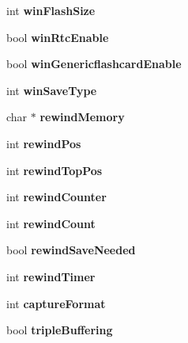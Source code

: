 \begin{DoxyCompactItemize}
\mbox{\label{class_v_b_a_a5c99844bc4d1e5556434afaa75ae91e5}} 
int {\bfseries win\+Flash\+Size}
\item 
\mbox{\label{class_v_b_a_ae289fc4c9e951e0844900c522c151170}} 
bool {\bfseries win\+Rtc\+Enable}
\item 
\mbox{\label{class_v_b_a_ac51ec97cd7b489be24edc77f346e5de7}} 
bool {\bfseries win\+Genericflashcard\+Enable}
\item 
\mbox{\label{class_v_b_a_a70060f88010280739406c87ef66d036a}} 
int {\bfseries win\+Save\+Type}
\item 
\mbox{\label{class_v_b_a_ad2f4e21586cc185a1e6525080532471a}} 
char $\ast$ {\bfseries rewind\+Memory}
\item 
\mbox{\label{class_v_b_a_a5d8ea18c98b5188813210a84819da5e8}} 
int {\bfseries rewind\+Pos}
\item 
\mbox{\label{class_v_b_a_aa83e33c3d4bb203a5d223a0906a977d8}} 
int {\bfseries rewind\+Top\+Pos}
\item 
\mbox{\label{class_v_b_a_a63a3cf03d4213b2596b59226134b0d5b}} 
int {\bfseries rewind\+Counter}
\item 
\mbox{\label{class_v_b_a_a39430ba84d3e7205846e24f0484d7880}} 
int {\bfseries rewind\+Count}
\item 
\mbox{\label{class_v_b_a_a3f8cd6f6705f0306f57818e885a50aa3}} 
bool {\bfseries rewind\+Save\+Needed}
\item 
\mbox{\label{class_v_b_a_a682a6a9633f41038b23a2bdcdbde844e}} 
int {\bfseries rewind\+Timer}
\item 
\mbox{\label{class_v_b_a_a103f0b25433c57c4458a208a06799cf8}} 
int {\bfseries capture\+Format}
\item 
\mbox{\label{class_v_b_a_af597e2c2466efdc6365a5d725651b855}} 
bool {\bfseries triple\+Buffering}
\item 

\end{DoxyCompactItemize}

